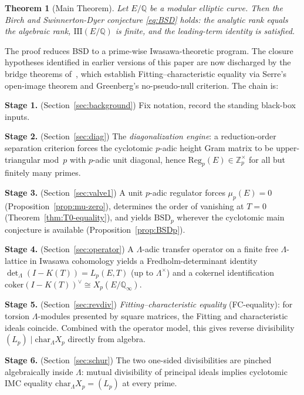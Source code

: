 \documentclass[12pt,reqno]{amsart}
\newtheorem{theorem}{Theorem}[section]
\theoremstyle{definition}
\theoremstyle{remark}
\newcommand{\Q}{\mathbb{Q}}
\newcommand{\Zp}{\mathbb{Z}_p}
\newcommand{\Qinf}{\Q_\infty}
\newcommand{\Lam}{\Lambda}
\newcommand{\Sha}{\mathrm{III}}
\newcommand{\ShaE}{\Sha(E/\Q){}}
\newcommand{\chr}{\mathrm{char}}
\newcommand{\Reg}{\mathrm{Reg}}
\begin{document}
\begin{theorem}[Main Theorem]\label{thm:main}
Let $E/\Q$ be a modular elliptic curve.  Then the Birch and Swinnerton-Dyer conjecture \eqref{eq:BSD} holds: the analytic rank equals the algebraic rank, $\ShaE$ is finite, and the leading-term identity is satisfied.
\end{theorem}

The proof reduces BSD to a prime-wise Iwasawa-theoretic program.  The closure hypotheses identified in earlier versions of this paper are now discharged by the bridge theorems of~\cite{F7}, which establish Fitting--characteristic equality via Serre's open-image theorem and Greenberg's no-pseudo-null criterion.  The chain is:

\medskip
\noindent\textbf{Stage 1.} (Section~\ref{sec:background}) Fix notation, record the standing black-box inputs.

\noindent\textbf{Stage 2.} (Section~\ref{sec:diag}) The \emph{diagonalization engine}: a reduction-order separation criterion forces the cyclotomic $p$-adic height Gram matrix to be upper-triangular mod~$p$ with $p$-adic unit diagonal, hence $\Reg_p(E)\in\Zp^\times$ for all but finitely many primes.

\noindent\textbf{Stage 3.} (Section~\ref{sec:valve1}) A unit $p$-adic regulator forces $\mu_p(E)=0$ (Proposition~\ref{prop:mu-zero}), determines the order of vanishing at $T=0$ (Theorem~\ref{thm:T0-equality}), and yields $\mathrm{BSD}_p$ wherever the cyclotomic main conjecture is available (Proposition~\ref{prop:BSDp}).

\noindent\textbf{Stage 4.} (Section~\ref{sec:operator}) A $\Lambda$-adic transfer operator on a finite free $\Lambda$-lattice in Iwasawa cohomology yields a Fredholm-determinant identity $\det_\Lambda(I-K(T))=L_p(E,T)$ (up to $\Lambda^\times$) and a cokernel identification $\mathrm{coker}(I-K(T))^\vee\cong X_p(E/\Qinf)$.

\noindent\textbf{Stage 5.} (Section~\ref{sec:revdiv}) \emph{Fitting--characteristic equality} (FC-equality): for torsion $\Lam$-modules presented by square matrices, the Fitting and characteristic ideals coincide.  Combined with the operator model, this gives reverse divisibility $(L_p)\mid\chr_\Lam X_p$ directly from algebra.

\noindent\textbf{Stage 6.} (Section~\ref{sec:schur}) The two one-sided divisibilities are pinched algebraically inside $\Lam$: mutual divisibility of principal ideals implies cyclotomic IMC equality $\chr_\Lam X_p=(L_p)$ at every prime.
\end{document}
